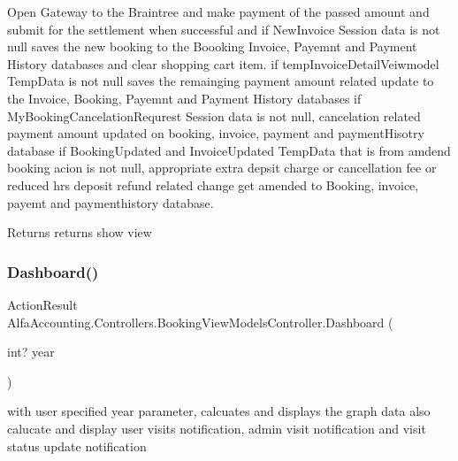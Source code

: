 Open Gateway to the Braintree and make payment of the passed amount and submit for the settlement when successful and if New\+Invoice Session data is not null saves the new booking to the Boooking Invoice, Payemnt and Payment History databases and clear shopping cart item. if temp\+Invoice\+Detail\+Veiwmodel Temp\+Data is not null saves the remainging payment amount related update to the Invoice, Booking, Payemnt and Payment History databases if My\+Booking\+Cancelation\+Requrest Session data is not null, cancelation related payment amount updated on booking, invoice, payment and payment\+Hisotry database if Booking\+Updated and Invoice\+Updated Temp\+Data that is from amdend booking acion is not null, appropriate extra depsit charge or cancellation fee or reduced hrs deposit refund related change get amended to Booking, invoice, payemt and paymenthistory database. 

\begin{DoxyReturn}{Returns}
returns show view
\end{DoxyReturn}
\mbox{\label{class_alfa_accounting_1_1_controllers_1_1_booking_view_models_controller_a5264795f04c49fa720e00514b644b57d}} 
\subsubsection{\texorpdfstring{Dashboard()}{Dashboard()}}
{\footnotesize\ttfamily Action\+Result Alfa\+Accounting.\+Controllers.\+Booking\+View\+Models\+Controller.\+Dashboard (\begin{DoxyParamCaption}\item[{int?}]{year }\end{DoxyParamCaption})}



with user specified year parameter, calcuates and displays the graph data also calucate and display user visits notification, admin visit notification and visit status update notification 


